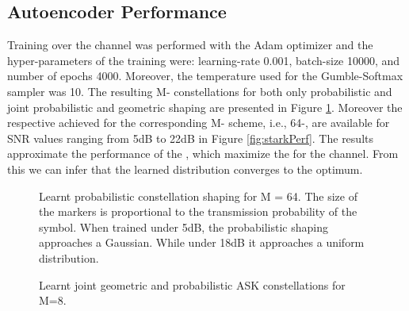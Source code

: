 \subsection{Autoencoder Performance}
Training over the  channel was performed with the Adam optimizer and the hyper-parameters of the training were: learning-rate 0.001, batch-size 10000, and number of epochs 4000. Moreover, the temperature used for the Gumble-Softmax sampler was 10.
The resulting M- constellations for both only probabilistic and joint probabilistic and geometric shaping are presented in Figure \ref{fig:starkMASK}. Moreover the respective achieved  for the corresponding M- scheme, i.e., 64-, are available for SNR values ranging from 5dB to 22dB in Figure \ref{fig:starkPerf}. The results approximate the performance of the , which maximize the  for the  channel. From this we can infer that the learned distribution converges to the optimum.

\begin{figure}[h]
	\subfigure[5dB]{
		
		\label{subfig:stark_pcs_5db}
	}
	\subfigure[18dB]{
		
		\label{subfig:stark_pcs_18db}
	}
	\caption{Learnt probabilistic constellation shaping for M = 64. The size of the markers is proportional to the transmission probability of the symbol. When trained under 5dB, the probabilistic shaping approaches a Gaussian. While under 18dB it approaches a uniform distribution. }
\end{figure}
	
\begin{figure}[h]
	\subfigure[SNR = 5dB]{
         
         \label{subfig:stark5dB}
    }
%         
%         
    \subfigure[SNR = 18dB]{
         
         \label{subfig:stark18dB}
    }
    \caption{Learnt joint geometric and probabilistic ASK constellations for M=8.}
    \label{fig:starkMASK}
\end{figure}


